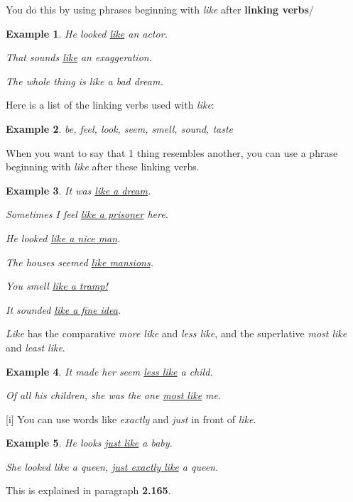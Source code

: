 \documentclass[oneside]{book}
\numberwithin{equation}{section}
\newtheorem{example}{Example}[section]
\begin{document}
You do this by using phrases beginning with \textit{like} after \textbf{linking verbs}/
\begin{example}
    He looked \underline{like} an actor.
    
    That sounds \underline{like} an exaggeration.
    
    The whole thing is like a bad dream.
\end{example}
Here is a list of the linking verbs used with \textit{like}:
\begin{example}
    be, feel, look, seem, smell, sound, taste
\end{example}
When you want to say that 1 thing resembles another, you can use a phrase beginning with \textit{like} after these linking verbs.
\begin{example}
    It was \underline{like a dream}.
    
    Sometimes I feel \underline{like a prisoner} here.
    
    He looked \underline{like a nice man}.
    
    The houses seemed \underline{like mansions}.
    
    You smell \underline{like a tramp!}
    
    It sounded \underline{like a fine idea}.
\end{example}
%
\noindent{} \textit{Like} has the comparative \textit{more like} and \textit{less like}, and the superlative \textit{most like} and \textit{least like}.
\begin{example}
    It made her seem \underline{less like} a child.
    
    Of all his children, she was the one \underline{most like} me.
\end{example}
%
\noindent{} [i] You can use words like \textit{exactly} and \textit{just} in front of \textit{like}.
\begin{example}
    He looks \underline{just like} a baby.
    
    She looked like a queen, \underline{just exactly like} a queen.
\end{example}
This is explained in paragraph \textbf{2.165}.
\end{document}
